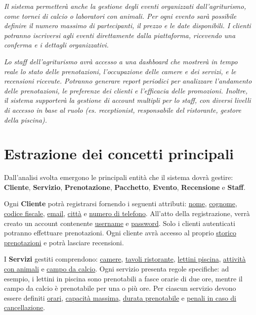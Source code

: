 \documentclass[a4paper,12pt]{report}
\begin{document}
\textit{Il sistema permetterà anche la gestione degli eventi organizzati dall'agriturismo, come
	tornei di calcio o laboratori con animali. Per ogni evento sarà possibile definire il numero massimo
	di partecipanti, il prezzo e le date disponibili. I clienti potranno iscriversi agli eventi
	direttamente dalla piattaforma, ricevendo una conferma e i dettagli organizzativi.}

\textit{Lo staff dell'agriturismo avrà accesso a una dashboard che mostrerà in tempo reale lo stato
	delle prenotazioni, l'occupazione delle camere e dei servizi, e le recensioni ricevute. Potranno
	generare report periodici per analizzare l'andamento delle prenotazioni, le preferenze dei clienti e
	l'efficacia delle promozioni. Inoltre, il sistema supporterà la gestione di account multipli per lo
	staff, con diversi livelli di accesso in base al ruolo (es. receptionist, responsabile del
	ristorante, gestore della piscina).}

\section{Estrazione dei concetti principali}
Dall'analisi svolta emergono le principali entità che il sistema dovrà gestire: \textbf{Cliente},
\textbf{Servizio}, \textbf{Prenotazione}, \textbf{Pacchetto}, \textbf{Evento}, \textbf{Recensione}
e \textbf{Staff}.

Ogni \textbf{Cliente} potrà registrarsi fornendo i seguenti attributi: \newline
\underline{nome}, \underline{cognome}, \underline{codice fiscale}, \underline{email},
\underline{città} e \underline{numero di telefono}. All'atto della registrazione, verrà creato un
account contenente \underline{username} e \underline{password}. Solo i clienti autenticati potranno
effettuare prenotazioni. Ogni cliente avrà accesso al proprio \underline{storico prenotazioni} e
potrà lasciare recensioni.

I \textbf{Servizi} gestiti comprendono: \underline{camere}, \underline{tavoli ristorante},
\underline{lettini piscina}, \newline \underline{attività con animali} e \underline{campo da calcio}. Ogni
servizio presenta regole specifiche: ad esempio, i lettini in piscina sono prenotabili a fasce
orarie di due ore, mentre il campo da calcio è prenotabile per una o più ore. Per ciascun servizio
devono essere definiti \underline{orari}, \underline{capacità massima}, \underline{durata
	prenotabile} e \underline{penali in caso di cancellazione}.
\end{document}
